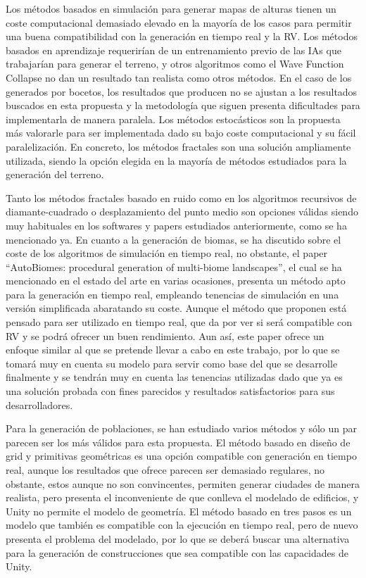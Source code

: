     Los métodos basados en simulación para generar mapas de alturas tienen un coste computacional demasiado elevado en la mayoría de los casos para permitir una buena compatibilidad con la generación en tiempo real y la RV. Los métodos basados en aprendizaje requerirían de un entrenamiento previo de las IAs que trabajarían para generar el terreno, y otros algoritmos como el Wave Function Collapse no dan un resultado tan realista como otros métodos. En el caso de los generados por bocetos, los resultados que producen no se ajustan a los resultados buscados en esta propuesta y la metodología que siguen presenta dificultades para implementarla de manera paralela. Los métodos estocásticos son la propuesta más valorarle para ser implementada dado su bajo coste computacional y su fácil paralelización. En concreto, los métodos fractales son una solución ampliamente utilizada, siendo la opción elegida en la mayoría de métodos estudiados para la generación del terreno. 

    Tanto los métodos fractales basado en ruido como en los algoritmos recursivos de diamante-cuadrado o desplazamiento del punto medio son opciones válidas siendo muy habituales en los softwares y papers estudiados anteriormente, como se ha mencionado ya. En cuanto a la generación de biomas, se ha discutido sobre el coste de los algoritmos de simulación en tiempo real, no obstante, el paper ``AutoBiomes: procedural generation of multi-biome landscapes''\cite{autobiomes}, el cual se ha mencionado en el estado del arte en varias ocasiones, presenta un método apto para la generación en tiempo real, empleando tenencias de simulación en una versión simplificada abaratando su coste. Aunque el método que proponen está pensado para ser utilizado en tiempo real, que da por ver si será compatible con RV y se podrá ofrecer un buen rendimiento. Aun así, este paper ofrece un enfoque similar al que se pretende llevar a cabo en este trabajo, por lo que se tomará muy en cuenta su modelo para servir como base del que se desarrolle finalmente y se tendrán muy en cuenta las tenencias utilizadas dado que ya es una solución probada con fines parecidos y resultados satisfactorios para sus desarrolladores.

    Para la generación de poblaciones, se han estudiado varios métodos y sólo un par parecen ser los más válidos para esta propuesta. El método basado en diseño de grid y primitivas geométricas es una opción compatible con generación en tiempo real, aunque los resultados que ofrece parecen ser demasiado regulares, no obstante, estos aunque no son convincentes, permiten generar ciudades de manera realista, pero presenta el inconveniente de que conlleva el modelado de edificios, y Unity no permite el modelo de geometría. El método basado en tres pasos es un modelo que también es compatible con la ejecución en tiempo real, pero de nuevo presenta el problema del modelado, por lo que se deberá buscar una alternativa para la generación de construcciones que sea compatible con las capacidades de Unity. 

